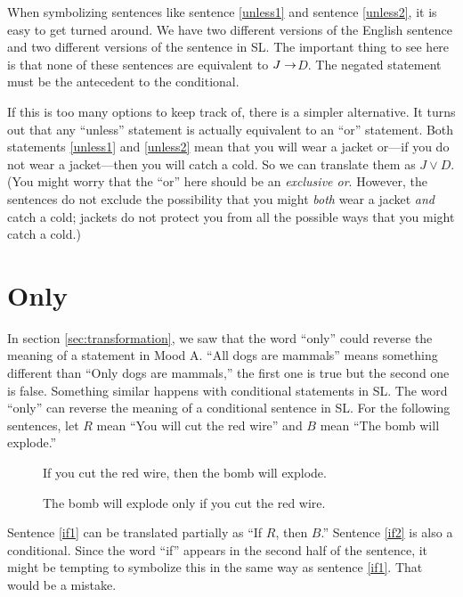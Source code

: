 When symbolizing sentences like sentence \ref{unless1} and sentence \ref{unless2}, it is easy to get turned around. We have two different versions of the English sentence and two different versions of the sentence in SL. The important thing to see here is that none of these sentences are equivalent to $J \mathrel{\rightarrow} $\lnot$ D$. The negated statement must be the antecedent to the conditional.

If this is too many options to keep track of, there is a simpler alternative. It turns out that any ``unless'' statement is actually equivalent to an ``or'' statement. Both statements \ref{unless1} and  \ref{unless2} mean that you will wear a jacket or---if you do not wear a jacket---then you will catch a cold. So we can translate them as $J \lor D$. (You might worry that the ``or'' here should be an \emph{exclusive or}. However, the sentences do not exclude the possibility that you might \emph{both} wear a jacket \emph{and} catch a cold; jackets do not protect you from all the possible ways that you might catch a cold.)

\section{Only}

In section \ref{sec:transformation}, we saw that the word ``only'' could reverse the meaning of a statement in Mood A. ``All dogs are mammals'' means something different than ``Only dogs are mammals,'' the first one is true but the second one is false. Something similar happens with conditional statements in SL.%
The word ``only'' can reverse the meaning of a conditional sentence in SL.
For the following sentences, let $R$ mean ``You will cut the red wire'' and $B$ mean ``The bomb will explode.''

\begin{description}
\item[] If you cut the red wire, then the bomb will explode.
\item[] The bomb will explode only if you cut the red wire.
\end{description}

Sentence \ref{if1} can be translated partially as ``If $R$, then $B$.'' Sentence \ref{if2} is also a conditional. Since the word ``if'' appears in the second half of the sentence, it might be tempting to symbolize this in the same way as sentence \ref{if1}. That would be a mistake.

